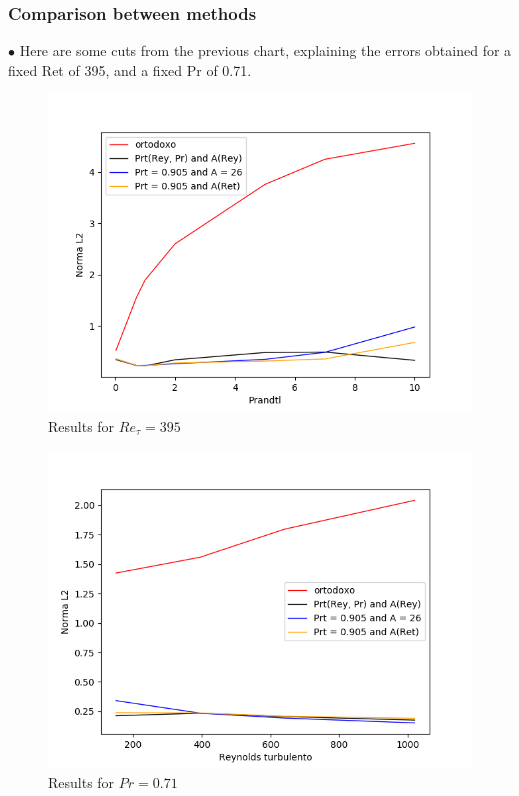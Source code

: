 \documentclass[xcolor=dvipsnames,8pt,aspectratio=34]{beamer}
\begin{document}
\begin{frame}
\frametitle{Comparison between methods}
$\bullet$ Here are some cuts from the previous chart, explaining the errors obtained for a fixed Ret of 395, and a fixed Pr of 0.71.\\
\begin{minipage}[h!]{0.47\textwidth}
\begin{figure}
	\centering
	\includegraphics[angle=0, scale=0.39]{finaispr}
	\caption{Results for $Re_\tau = 395$}
\end{figure}
\end{minipage}
\begin{minipage}[h!]{0.47\textwidth}
\begin{figure}
	\centering
	\includegraphics[angle=0, scale=0.39]{finaisRey}
	\caption{Results for $Pr = 0.71$}
\end{figure}
\end{minipage}\\
\end{frame}
\end{document}
